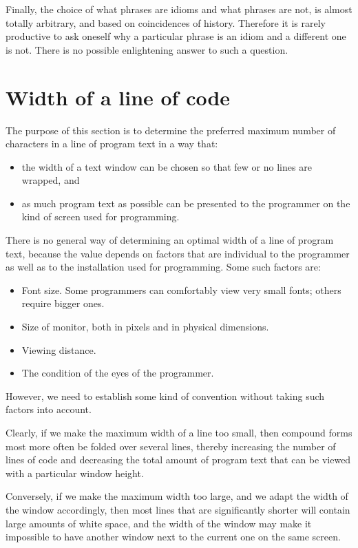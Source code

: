 Finally, the choice of what phrases are idioms and what phrases are
not, is almost totally arbitrary, and based on coincidences of
history.  Therefore it is rarely productive to ask oneself why a
particular phrase is an idiom and a different one is not.  There is no
possible enlightening answer to such a question.


\section{Width of a line of code}

The purpose of this section is to determine the preferred maximum
number of characters in a line of program text in a way that:
\begin{itemize}
\item the width of a text window can be chosen so that few or no lines
  are wrapped, and
\item as much program text as possible can be presented to the
  programmer on the kind of screen used for programming.
\end{itemize}

There is no general way of determining an optimal width of a line of
program text, because the value depends on factors that are individual
to the programmer as well as to the installation used for programming.
Some such factors are:

\begin{itemize}
\item Font size.  Some programmers can comfortably view very small
  fonts; others require bigger ones.
\item Size of monitor, both in pixels and in physical dimensions.
\item Viewing distance.
\item The condition of the eyes of the programmer.
\end{itemize}

However, we need to establish some kind of convention without taking
such factors into account.

Clearly, if we make the maximum width of a line too small, then
compound forms most more often be folded over several lines, thereby
increasing the number of lines of code and decreasing the total amount
of program text that can be viewed with a particular window height.

Conversely, if we make the maximum width too large, and we adapt the
width of the window accordingly, then most lines that are
significantly shorter will contain large amounts of white space, and
the width of the window may make it impossible to have another window
next to the current one on the same screen.

